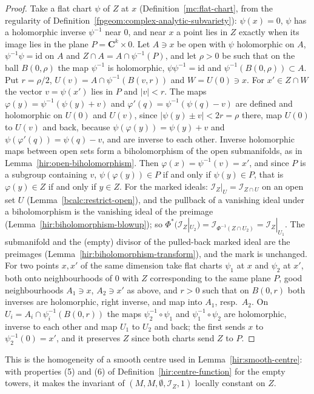 \begin{proof}
\leanok
Take a flat chart \(\psi\) of \(Z\) at \(x\) (Definition~\ref{mc:flat-chart}, from the regularity of Definition~\ref{fpgeom:complex-analytic-subvariety}): \(\psi(x)=0\),
\(\psi\) has a holomorphic inverse \(\psi^{-1}\) near \(0\), and near \(x\) a point lies in \(Z\) exactly when its image lies in the plane \(P=\mathbf C^k\times0\). Let \(A\ni x\)
be open with \(\psi\) holomorphic on \(A\), \(\psi^{-1}\psi=\mathrm{id}\) on \(A\) and \(Z\cap A=A\cap\psi^{-1}(P)\), and let \(\rho>0\) be such that on the ball \(B(0,\rho)\) the map
\(\psi^{-1}\) is holomorphic, \(\psi\psi^{-1}=\mathrm{id}\) and \(\psi^{-1}(B(0,\rho))\subset A\). Put \(r=\rho/2\), \(U(v)=A\cap\psi^{-1}(B(v,r))\) and \(W=U(0)\ni x\).
For \(x'\in Z\cap W\) the vector \(v=\psi(x')\) lies in \(P\) and \(|v|<r\). The maps \(\varphi(y)=\psi^{-1}(\psi(y)+v)\) and \(\varphi'(q)=\psi^{-1}(\psi(q)-v)\) are defined and
holomorphic on \(U(0)\) and \(U(v)\), since \(|\psi(y)\pm v|<2r=\rho\) there, map \(U(0)\) to \(U(v)\) and back, because \(\psi(\varphi(y))=\psi(y)+v\) and
\(\psi(\varphi'(q))=\psi(q)-v\), and are inverse to each other. Inverse holomorphic maps between open sets form a biholomorphism of the open submanifolds, as in
Lemma~\ref{hir:open-biholomorphism}. Then \(\varphi(x)=\psi^{-1}(v)=x'\), and since \(P\) is a subgroup containing \(v\), \(\psi(\varphi(y))\in P\) if and only if
\(\psi(y)\in P\), that is \(\varphi(y)\in Z\) if and only if \(y\in Z\).
For the marked ideals: \(\mathcal I_Z|_U=\mathcal I_{Z\cap U}\) on an open set \(U\) (Lemma~\ref{bcalc:restrict-open}), and the pullback of a vanishing ideal under a
biholomorphism is the vanishing ideal of the preimage (Lemma~\ref{hir:biholomorphism-blowup}); so \(\Phi^*(\mathcal I_Z|_{U_2})=\mathcal I_{\Phi^{-1}(Z\cap U_2)}=\mathcal I_Z|_{U_1}\).
The submanifold and the (empty) divisor of the pulled-back marked ideal are the preimages (Lemma~\ref{hir:biholomorphism-transform}), and the mark is unchanged.
For two points \(x,x'\) of the same dimension take flat charts \(\psi_1\) at \(x\) and \(\psi_2\) at \(x'\), both onto neighbourhoods of \(0\) with \(Z\) corresponding to the
same plane \(P\), good neighbourhoods \(A_1\ni x\), \(A_2\ni x'\) as above, and \(r>0\) such that on \(B(0,r)\) both inverses are holomorphic, right inverse, and map into
\(A_1\), resp.\ \(A_2\). On \(U_i=A_i\cap\psi_i^{-1}(B(0,r))\) the maps \(\psi_2^{-1}\circ\psi_1\) and \(\psi_1^{-1}\circ\psi_2\) are holomorphic, inverse to each other and map
\(U_1\) to \(U_2\) and back; the first sends \(x\) to \(\psi_2^{-1}(0)=x'\), and it preserves \(Z\) since both charts send \(Z\) to \(P\).
\end{proof}
This is the homogeneity of a smooth centre used in Lemma~\ref{hir:smooth-centre}: with properties (5) and (6) of Definition~\ref{hir:centre-function} for the empty towers,
it makes the invariant of \((M,M,\emptyset,\mathcal I_Z,1)\) locally constant on \(Z\).

